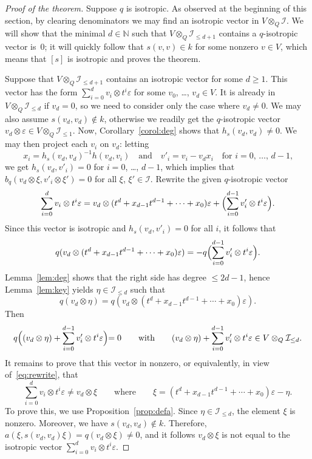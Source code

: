 \documentclass{amsart}
\newcommand{\calI}{\mathcal{I}}
\theoremstyle{remark}
\begin{document}
\begin{proof}[Proof of the theorem]
  Suppose $q$ is isotropic. As observed at the beginning of this
  section, by clearing denominators we may find an isotropic vector in
  $V\otimes_Q\calI$. We will
  show that the minimal $d\in\mathbb{N}$ such that
  $V\otimes_Q\calI_{\leq d+1}$ 
  contains a $q$-isotropic vector is~$0$; it will quickly follow
  that $s(v,v)\in k$ for some nonzero $v\in V$, which means that $[s]$
  is isotropic and proves the theorem. 

  Suppose that $V\otimes_Q\calI_{\leq d+1}$ contains an isotropic
  vector 
  for some $d\geq1$. This vector has the form
  $\sum_{i=0}^{d}v_i\otimes t^i\varepsilon$ for some $v_0$, \ldots,
  $v_{d}\in V$. It is already in $V\otimes_Q\calI_{\leq
    d}$ if $v_{d}=0$, so we need to consider only the case where
  $v_{d}\neq0$. We may also assume $s(v_{d},v_d)\notin k$,
  otherwise we readily get the $q$-isotropic vector
  $v_{d}\otimes\varepsilon\in V\otimes_Q\calI_{\leq1}$. 
  Now, Corollary~\ref{corol:deg} shows that $h_s(v_{d},v_{d})\neq0$.
  We may then project each $v_i$ on $v_{d}$: letting
  \[
    x_i=h_s(v_{d},v_{d})^{-1}h(v_{d},v_i)
    \quad\text{and}\quad
    v'_i=v_i-v_{d}x_i
    \quad\text{for $i=0$, \ldots, $d-1$,}
  \]
  we get $h_s(v_{d},v'_i)=0$ for $i=0$, \ldots, $d-1$, which implies
  that $b_q(v_d\otimes\xi,v'_i\otimes\xi')=0$ for all $\xi$,
  $\xi'\in\calI$.  Rewrite the
  given $q$-isotropic vector
  \begin{equation}
    \label{eq:rewrite}
    \sum_{i=0}^{d} v_i\otimes t^i\varepsilon =
    v_{d}\otimes(t^{d}+x_{d-1}t^{d-1}+\cdots+x_0)\varepsilon +
    \Bigl(\sum_{i=0}^{d-1}v'_i\otimes t^i\varepsilon\Bigr).
  \end{equation}
  Since this vector is isotropic and $h_s(v_{d},v'_i)=0$ for all $i$,
  it follows that
  \[
    q(v_{d}\otimes(t^{d}+x_{d-1}t^{d-1}+ \cdots +
    x_0)\varepsilon) = -q\Bigl(\sum_{i=0}^{d-1} v'_i\otimes
    t^i\varepsilon\Bigr).
  \]
  Lemma~\ref{lem:deg} shows that the right side has degree
  $\leq2d-1$, hence Lemma~\ref{lem:key} yields $\eta\in\calI_{\leq
    d}$ such that
  \[
    q(v_{d}\otimes\eta) =
    q(v_{d}\otimes(t^{d}+x_{d-1}t^{d-1}+ \cdots + 
    x_0)\varepsilon).
  \]
  Then
  \[
    q\Bigl((v_d\otimes\eta) + \sum_{i=0}^{d-1} v'_i\otimes
    t^i\varepsilon\Bigl)=0
    \qquad\text{with}
    \qquad
    (v_d\otimes\eta) + \sum_{i=0}^{d-1} v'_i\otimes
    t^i\varepsilon\in V\otimes_Q\calI_{\leq d}.
  \]
  It remains to prove that this vector in nonzero, or equivalently, in view of~\eqref{eq:rewrite}, that 
  \[
    \sum_{i=0}^d v_i\otimes t^i\varepsilon \not= v_d\otimes\xi
    \qquad\text{where}\qquad
    \xi= (t^{d}+x_{d-1}t^{d-1}+ \cdots + 
    x_0)\varepsilon-\eta.
  \]
  To prove this, we use Proposition~\ref{prop:defa}. Since
  $\eta\in\calI_{\leq d}$, the element $\xi$ is nonzero. Moreover, we
  have $s(v_d,v_d)\not \in k$. Therefore,  
        $a(\xi, s(v_d,v_d)\xi)=q(v_d\otimes\xi)\not=0$, and it follows
        $v_d\otimes \xi$ is not equal to the isotropic vector
        $\sum_{i=0}^d v_i\otimes t^i\varepsilon$. 
 

\end{proof}
\end{document}
